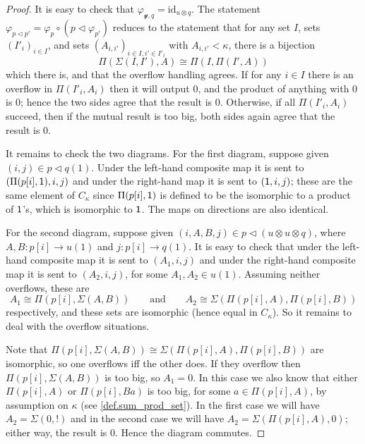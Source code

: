 \documentclass[11pt, one side, article]{memoir}
\theoremstyle{definition}
\theoremstyle{plain}
\newcommand{\id}{\mathrm{id}}
\newcommand{\yon}{\mathcal{y}}
\newcommand{\0}{\textsf{0}}
\newcommand{\1}{\tn{\textsf{1}}}
\newcommand{\tri}{\mathbin{\triangleleft}}
\newcommand{\qqand}{\qquad\text{and}\qquad}
\begin{document}
\begin{proof}
It is easy to check that $\varphi_{\yon,q}=\id_{u\otimes q}$. The statement $\varphi_{p\tri p'}=\varphi_{p}\circ (p\tri\varphi_{p'})$ reduces to the statement that for any set $I$, sets $(I'_i)_{i\in I}$, and sets $(A_{i,i'})_{i\in I, i'\in I'_i}$ with $A_{i,i'}<\kappa$, there is a bijection
\[
	\Pi(\Sigma(I,I'),A)\cong\Pi(I,\Pi(I',A))
\]
which there is, and that the overflow handling agrees. If for any $i\in I$ there is an overflow in $\Pi(I'_i,A_i)$ then it will output $0$, and the product of anything with $0$ is $0$; hence the two sides agree that the result is $0$. Otherwise, if all $\Pi(I'_i,A_i)$ succeed, then if the mutual result is too big, both sides again agree that the result is $0$.

It remains to check the two diagrams. For the first diagram, suppose given $(i,j)\in p\tri q(1)$. Under the left-hand composite map it is sent to $(\Pi(p[i],\1),i,j)$ and under the right-hand map it is sent to $(\1,i,j)$; these are the same element of $C_\kappa$  since $\Pi(p[i],\1)$ is defined to be the isomorphic to a product of $\1$'s, which is isomorphic to $\1$. The maps on directions are also identical.

For the second diagram, suppose given $(i,A,B,j)\in p\tri(u\otimes u\otimes q)$, where $A,B\colon p[i]\to u(1)$ and $j\colon p[i]\to q(1)$. It is easy to check that under the left-hand composite map it is sent to $(A_1,i,j)$ and under the right-hand composite map it is sent to $(A_2,i,j)$, for some $A_1,A_2\in u(1)$. Assuming neither overflows, these are 
\[
  A_1\cong\Pi(p[i],\Sigma(A,B))
  \qqand
	A_2\cong\Sigma(\Pi(p[i],A),\Pi(p[i],B))
\] 
respectively, and these sets are isomorphic (hence equal in $C_\kappa$). So it remains to deal with the overflow situations.

Note that $\Pi(p[i],\Sigma(A,B))\cong\Sigma(\Pi(p[i],A),\Pi(p[i],B))$ are isomorphic, so one overflows iff the other does. If they overflow then $\Pi(p[i],\Sigma(A,B))$ is too big, so $A_1=0$. In this case we also know that either $\Pi(p[i],A)$ or $\Pi(p[i],Ba)$ is too big, for some $a\in\Pi(p[i],A)$, by assumption on $\kappa$ (see \cref{def.sum_prod_set}). In the first case we will have $A_2=\Sigma(0,!)$ and in the second case we will have $A_2=\Sigma(\Pi(p[i],A),0)$; either way, the result is $0$. Hence the diagram commutes.
\end{proof}
\end{document}
